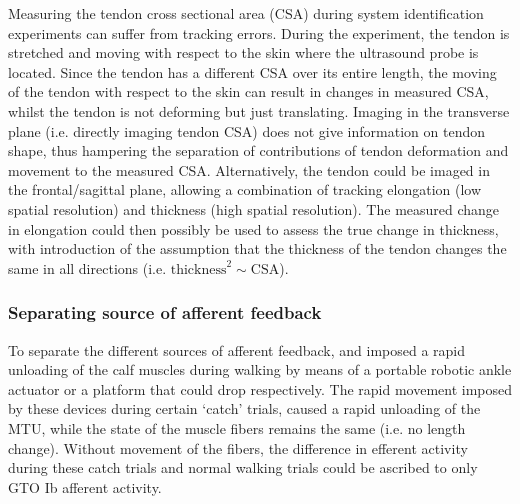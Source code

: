 Measuring the tendon cross sectional area (CSA) during system identification experiments can suffer from tracking errors. During the experiment, the tendon is stretched and moving with respect to the skin where the ultrasound probe is located. Since the tendon has a different CSA over its entire length, the moving of the tendon with respect to the skin can result in changes in measured CSA, whilst the tendon is not deforming but just translating. Imaging in the transverse plane (i.e. directly imaging tendon CSA) does not give information on tendon shape, thus hampering the separation of contributions of tendon deformation and movement to the measured CSA. Alternatively, the tendon could be imaged in the frontal/sagittal plane, allowing a combination of tracking elongation (low spatial resolution) and thickness (high spatial resolution). The measured change in elongation could then possibly be used to assess the true change in thickness, with introduction of the assumption that the thickness of the tendon changes the same in all directions (i.e. $\text{thickness}^2 \sim \text{CSA}$). 



\subsubsection{Separating source of afferent feedback}
To separate the different sources of afferent feedback, \citet{grey_positive_2007} and \citet{af_klint_sudden_2009} imposed a rapid unloading of the calf muscles during walking by means of a portable robotic ankle actuator or a platform that could drop respectively. The rapid movement imposed by these devices during certain `catch' trials, caused a rapid unloading of the MTU, while the state of the muscle fibers remains the same (i.e. no length change). Without movement of the fibers, the difference in efferent activity during these catch trials and normal walking trials could be ascribed to only GTO Ib afferent activity. 

